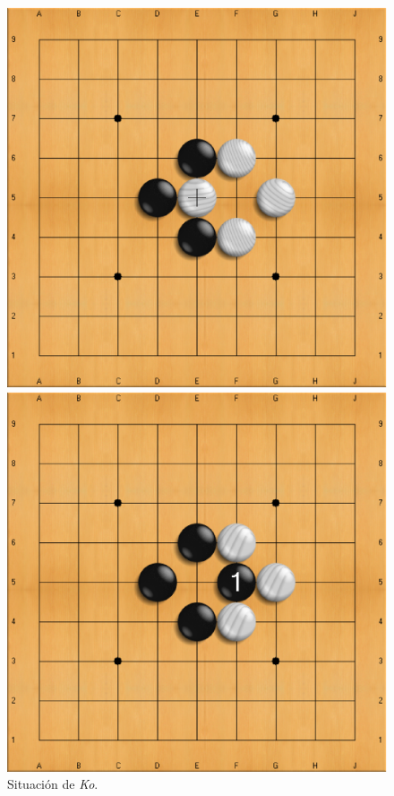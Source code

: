 \begin{itemize}
\begin{figure}[t]
\begin{minipage}[t]{0.4\linewidth}
		\includegraphics[scale=0.2]{contenido/cap2/imagenes/ko1.eps}
	\end{minipage}
	\hspace{1cm}
	\begin{minipage}[t]{0.4\linewidth}
		\centering
		\includegraphics[scale=0.2]{contenido/cap2/imagenes/ko2.eps}
	\end{minipage}
	\caption[Situación de \textit{Ko} en el Go]{Situación de \textit{Ko}.}
	\label{fig:go_ko}
\end{figure}
\end{itemize}

